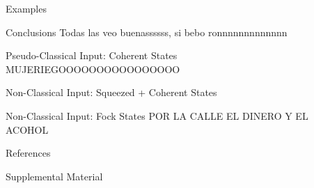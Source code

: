 \documentclass[final]{beamer}
\newlength{\sepwidth}
\newlength{\colwidth}
\newcommand{\separatorcolumn}{\begin{column}{\sepwidth}\end{column}}
\begin{document}
\begin{frame}[t]
\begin{columns}[t]
\begin{column}{\colwidth}
\begin{block}{Examples}

\end{block}

   \begin{block}{Conclusions}
     Todas las veo buenassssss, si bebo ronnnnnnnnnnnnn
  \end{block}


  \begin{exampleblock}{Pseudo-Classical Input: Coherent States}
MUJERIEGOOOOOOOOOOOOOOOO

  \end{exampleblock}


  \begin{exampleblock}{Non-Classical Input: Squeezed + Coherent States}

  \end{exampleblock}


  \begin{exampleblock}{Non-Classical Input: Fock States}
POR LA CALLE EL DINERO Y EL ACOHOL
  \end{exampleblock}


  \begin{block}{References}

    \nocite{*}
    \footnotesize{}

  \end{block}

  \begin{block}{Supplemental Material}

    

  \end{block}

\end{column}
\separatorcolumn
\end{columns}
\end{frame}
\end{document}
